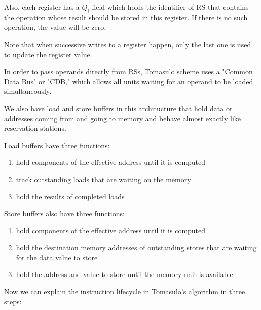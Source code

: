 \documentclass[12pt]{article}
\begin{document}
Also, each register has a $Q_i$ field which holds the identifier of RS that contains the operation whose result should be stored in this register. If there is no such operation, the value will be zero.

Note that when successive writes to a register happen, only the last one is used to update the register value.

In order to pass operands directly from RSs, Tomasulo scheme uses a "Common Data Bus" or "CDB," which allows all units waiting for an operand to be loaded simultaneously.

We also have load and store buffers in this architucture that hold data or addresses coming from and going to memory and behave almost exactly like reservation stations.

Load buffers have three functions:
\begin{enumerate}
	\item hold components of the effective address until it is computed
	\item track outstanding loads that are waiting on the memory
	\item hold the results of completed loads 
\end{enumerate}

Store buffers also have three functions:
\begin{enumerate}
	\item hold components of the effective address until it is computed
	\item hold the destination memory addresses of outstanding stores that are waiting for the data	value to store
	\item hold the address and value to store until the memory unit is available.
\end{enumerate}


Now we can explain the instruction lifecycle in Tomasulo's algorithm in three steps:
\end{document}
